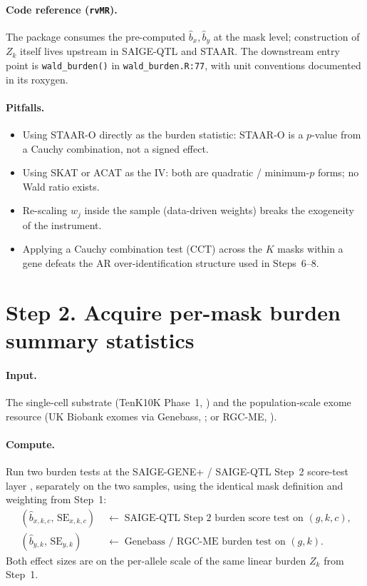\documentclass[11pt]{article}
\begin{document}
\paragraph{Code reference (\texttt{rvMR}).} The package consumes the pre-computed $\hat b_x,\hat b_y$ at the mask level; construction of $Z_k$ itself lives upstream in SAIGE-QTL and STAAR. The downstream entry point is \verb|wald_burden()| in \verb|wald_burden.R:77|, with unit conventions documented in its roxygen.

\paragraph{Pitfalls.}
\begin{itemize}
\item Using STAAR-O directly as the burden statistic: STAAR-O is a $p$-value from a Cauchy combination, not a signed effect.
\item Using SKAT or ACAT as the IV: both are quadratic / minimum-$p$ forms; no Wald ratio exists.
\item Re-scaling $w_j$ inside the sample (data-driven weights) breaks the exogeneity of the instrument.
\item Applying a Cauchy combination test (CCT) across the $K$ masks within a gene defeats the AR over-identification structure used in Steps~6--8.
\end{itemize}

\section*{Step 2. Acquire per-mask burden summary statistics}

\paragraph{Input.} The single-cell substrate (TenK10K Phase~1, \citealp{Cuomo2025}) and the population-scale exome resource (UK Biobank exomes via Genebass, \citealp{Karczewski2022}; or RGC-ME, \citealp{SunKY2024}).

\paragraph{Compute.} Run two burden tests at the SAIGE-GENE+ / SAIGE-QTL Step~2 score-test layer \citep{ZhouSAIGEgene2022,ZhouCuomo2024}, separately on the two samples, using the identical mask definition and weighting from Step~1:
\begin{align}
(\hat b_{x,k,c},\, \mathrm{SE}_{x,k,c}) &\;\leftarrow\; \text{SAIGE-QTL Step 2 burden score test on $(g,k,c)$,}\\
(\hat b_{y,k},\, \mathrm{SE}_{y,k}) &\;\leftarrow\; \text{Genebass / RGC-ME burden test on $(g,k)$.}
\end{align}
Both effect sizes are on the per-allele scale of the same linear burden $Z_k$ from Step~1.
\end{document}
